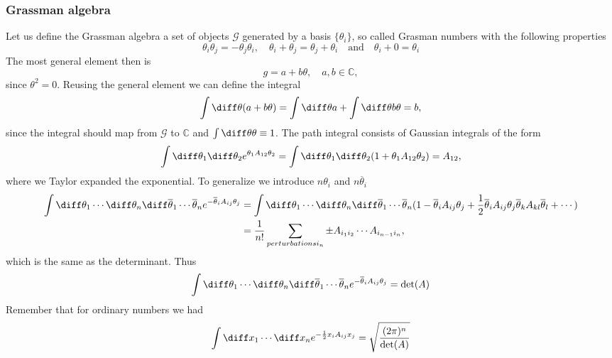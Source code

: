 \subsubsection{Grassman algebra}
Let us define the Grassman algebra a set of objects $\mathcal{G}$ generated by a basis $\{\theta_i\}$, so called Grasman numbers with the following properties
\begin{equation}
	\theta_i \theta_j = - \theta_j \theta_i, \quad \theta_i + \theta_j = \theta_j + \theta_i \quad \text{and} \quad \theta_i + 0 = \theta_i
\end{equation}
The most general element then is
\begin{equation}
	g = a + b \theta, \quad a, b \in \mathbb{C},
\end{equation}
since $\theta^2 = 0$. Reusing the general element we can define the integral
\begin{equation}
	\int \diff \theta ( a + b\theta ) = \int \diff \theta a + \int \diff \theta b \theta = b,
\end{equation}
since the integral should map from $\mathcal{G}$ to $\mathbb{C}$ and $\int \diff \theta \theta \equiv 1$. The path integral consists of Gaussian integrals of the form
\begin{equation}
	\int \diff \theta_1\diff \theta_2 e^{\theta_1 A_{12} \theta_2} = \int \diff \theta_1 \diff \theta_2 (1 + \theta_1 A_{12} \theta_2) = A_{12},
\end{equation}
where we Taylor expanded the exponential. To generalize we introduce $n\theta_i$ and $n \overline \theta_i$
\begin{align}
	\int \diff \theta_1 \cdots \diff \theta_n \diff \overline \theta_1 \cdots \overline \theta_n e^{- \overline \theta_i A_{ij} \theta_j}  &= \int \diff \theta_1 \cdots \diff \theta_n \diff \overline \theta_1 \cdots \overline \theta_n (1 - \overline \theta_i A_{ij} \theta_j + \frac{1}{2} \overline \theta_i A_{ij} \theta_j \overline \theta_k A_{kl} \overline \theta_l + \cdots ) \\
	&= \frac{1}{n!} \sum_{perturbations{i_n}} \pm A_{i_1i_2} \cdots A_{i_{n-1}i_n},
\end{align}
which is the same as the determinant. Thus
\begin{equation}
	\int \diff \theta_1 \cdots \diff \theta_n \diff \overline \theta_1 \cdots \overline \theta_n e^{- \overline \theta_i A_{ij} \theta_j} = \det(A)
\end{equation}
Remember that for ordinary numbers we had
\begin{equation}
	\int \diff x_1 \cdots \diff x_n e^{-\frac{1}{2} x_i A_{ij} x_j} = \sqrt{\frac{(2\pi)^n}{\det(A)}}
\end{equation}
